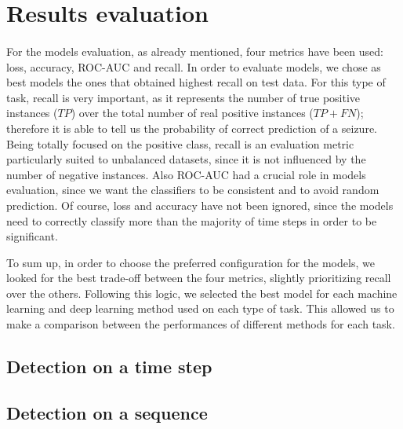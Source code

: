 
\section{Results evaluation} \label{sec: results}

\paragraph{} For the models evaluation, as already mentioned, four metrics have been used: loss, accuracy, ROC-AUC and recall. In order to evaluate models, we chose as best models the ones that obtained highest recall on test data. For this type of task, recall is very important, as it represents the number of true positive instances ($TP$) over the total number of real positive instances ($TP+FN$); therefore it is able to tell us the probability of correct prediction of a seizure. Being totally focused on the positive class, recall is an evaluation metric particularly suited to unbalanced datasets, since it is not influenced by the number of negative instances. Also ROC-AUC had a crucial role in models evaluation, since we want the classifiers to be consistent and to avoid random prediction. Of course, loss and accuracy have not been ignored, since the models need to correctly classify more than the majority of time steps in order to be significant.

To sum up, in order to choose the preferred configuration for the models, we looked for the best trade-off between the four metrics, slightly prioritizing recall over the others. Following this logic, we selected the best model for each machine learning and deep learning method used on each type of task. This allowed us to make a comparison between the performances of different methods for each task.

\subsection{Detection on a time step}
\subsection{Detection on a sequence}
